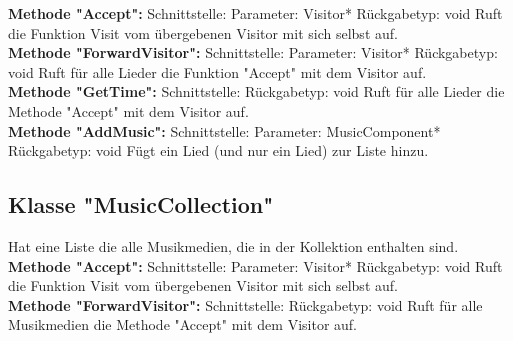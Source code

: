\documentclass[12pt,a4paper]{article}
\begin{document}
\textbf {Methode "Accept": } 
\newline
Schnittstelle: 
\newline
Parameter: Visitor*
\newline
Rückgabetyp: void
\newline
Ruft die Funktion Visit vom übergebenen Visitor mit sich selbst auf.
\\

\textbf {Methode "ForwardVisitor": } 
\newline
Schnittstelle:
\newline
Parameter: Visitor*
\newline
Rückgabetyp: void
\newline
Ruft für alle Lieder die Funktion "Accept" mit dem Visitor auf.
\\

\textbf {Methode "GetTime": } 
\newline
Schnittstelle:
\newline
Rückgabetyp: void
\newline
Ruft für alle Lieder die Methode "Accept" mit dem Visitor auf.
\\

\textbf {Methode "AddMusic": } 
\newline
Schnittstelle:
\newline
Parameter: MusicComponent*
\newline
Rückgabetyp: void
\newline
Fügt ein Lied (und nur ein Lied) zur Liste hinzu.
\\

\subsection {Klasse "MusicCollection"}
Hat eine Liste die alle Musikmedien, die in der Kollektion enthalten sind.
\\

\textbf {Methode "Accept": } 
\newline
Schnittstelle: 
\newline
Parameter: Visitor*
\newline
Rückgabetyp: void
\newline
Ruft die Funktion Visit vom übergebenen Visitor mit sich selbst auf.
\\

\textbf {Methode "ForwardVisitor": } 
\newline
Schnittstelle:
\newline
Rückgabetyp: void
\newline
Ruft für alle Musikmedien die Methode "Accept" mit dem Visitor auf.
\\
\end{document}

